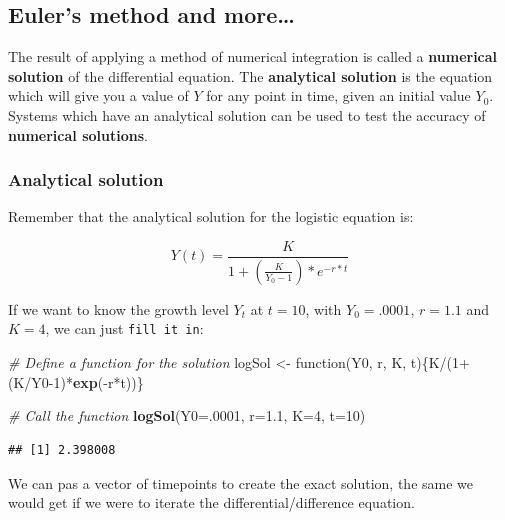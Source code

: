 \documentclass[]{book}
\newenvironment{Shaded}{\begin{snugshade}}{\end{snugshade}}
\newcommand{\KeywordTok}[1]{\textcolor[rgb]{0.13,0.29,0.53}{\textbf{{#1}}}}
\newcommand{\DataTypeTok}[1]{\textcolor[rgb]{0.13,0.29,0.53}{{#1}}}
\newcommand{\DecValTok}[1]{\textcolor[rgb]{0.00,0.00,0.81}{{#1}}}
\newcommand{\FloatTok}[1]{\textcolor[rgb]{0.00,0.00,0.81}{{#1}}}
\newcommand{\StringTok}[1]{\textcolor[rgb]{0.31,0.60,0.02}{{#1}}}
\newcommand{\CommentTok}[1]{\textcolor[rgb]{0.56,0.35,0.01}{\textit{{#1}}}}
\newcommand{\NormalTok}[1]{{#1}}
\begin{document}
\subsection*{Euler's method and
more\ldots{}}\label{eulers-method-and-more}

The result of applying a method of numerical integration is called a
\textbf{numerical solution} of the differential equation. The
\textbf{analytical solution} is the equation which will give you a value
of \(Y\) for any point in time, given an initial value \(Y_0\). Systems
which have an analytical solution can be used to test the accuracy of
\textbf{numerical solutions}.

\subsubsection*{Analytical solution}\label{analytical-solution}

Remember that the analytical solution for the logistic equation is:

\[
Y(t)  =  \frac{K}{1 + \left(\frac{K}{Y_{0} - 1}\right) * e^{-r*t} }
\]

If we want to know the growth level \(Y_t\) at \(t=10\), with
\(Y_0=.0001\), \(r=1.1\) and \(K=4\), we can just \texttt{fill\ it\ in}:

\begin{Shaded}
\begin{Highlighting}[]
\CommentTok{# Define a function for the solution}
\NormalTok{logSol <-}\StringTok{ }\NormalTok{function(Y0, r, K, t)\{K/(}\DecValTok{1}\NormalTok{+(K/Y0}\DecValTok{-1}\NormalTok{)*}\KeywordTok{exp}\NormalTok{(-r*t))\}}

\CommentTok{# Call the function}
\KeywordTok{logSol}\NormalTok{(}\DataTypeTok{Y0=}\NormalTok{.}\DecValTok{0001}\NormalTok{, }\DataTypeTok{r=}\FloatTok{1.1}\NormalTok{, }\DataTypeTok{K=}\DecValTok{4}\NormalTok{, }\DataTypeTok{t=}\DecValTok{10}\NormalTok{)}
\end{Highlighting}
\end{Shaded}

\begin{verbatim}
## [1] 2.398008
\end{verbatim}

We can pas a vector of timepoints to create the exact solution, the same
we would get if we were to iterate the differential/difference equation.
\end{document}
